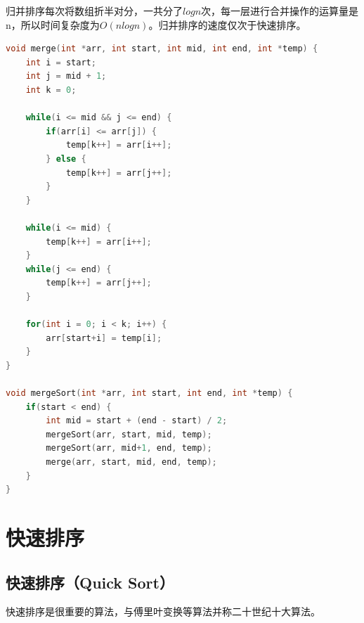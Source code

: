归并排序每次将数组折半对分，一共分了$ logn $次，每一层进行合并操作的运算量是n，所以时间复杂度为$ O(nlogn) $。归并排序的速度仅次于快速排序。\\

\begin{table}[H]
	\centering
	\caption{归并排序算法分析}
\end{table}


\begin{lstlisting}[language=C]
void merge(int *arr, int start, int mid, int end, int *temp) {
    int i = start;
    int j = mid + 1;
    int k = 0;

    while(i <= mid && j <= end) {
        if(arr[i] <= arr[j]) {
            temp[k++] = arr[i++];
        } else {
            temp[k++] = arr[j++];
        }
    }

    while(i <= mid) {
        temp[k++] = arr[i++];
    }
    while(j <= end) {
        temp[k++] = arr[j++];
    }

    for(int i = 0; i < k; i++) {
        arr[start+i] = temp[i];
    }
}

void mergeSort(int *arr, int start, int end, int *temp) {
    if(start < end) {
        int mid = start + (end - start) / 2;
        mergeSort(arr, start, mid, temp);
        mergeSort(arr, mid+1, end, temp);
        merge(arr, start, mid, end, temp);
    }
}
\end{lstlisting}

\newpage

\section{快速排序}

\subsection{快速排序（Quick Sort）}

快速排序是很重要的算法，与傅里叶变换等算法并称二十世纪十大算法。\\


